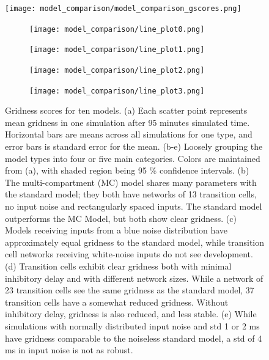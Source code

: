 \documentclass{article}
\begin{document}
    \begin{figure}[H]
        \centering  
        \begin{minipage}[b]{1\textwidth}
            \centering
            \subcaption{}
            \texttt{[image: model\_comparison/model\_comparison\_gscores.png]}
        \end{minipage}
        \begin{minipage}[t]{1\textwidth}
            \begin{subfigure}{0.5\textwidth}
                \subcaption{}
                \texttt{[image: model\_comparison/line\_plot0.png]}
            \end{subfigure}
            \begin{subfigure}{0.5\textwidth}
                \subcaption{}
                \texttt{[image: model\_comparison/line\_plot1.png]}
            \end{subfigure}
            \begin{subfigure}{0.5\textwidth}
                \subcaption{}
                \texttt{[image: model\_comparison/line\_plot2.png]}
            \end{subfigure}
            \begin{subfigure}{0.5\textwidth}
                \subcaption{}
                \texttt{[image: model\_comparison/line\_plot3.png]}
            \end{subfigure}
        \end{minipage}
        \caption{Gridness scores for ten models. (a) Each scatter point represents mean gridness in one simulation after 95 minutes simulated time. Horizontal bars are means across all simulations for one type, and error bars is standard error for the mean. (b-e) Loosely grouping the model types into four or five main categories. Colors are maintained from (a), with shaded region being 95 \% confidence intervals. (b) The multi-compartment (MC) model shares many parameters with the standard model; they both have networks of 13 transition cells, no input noise and rectangularly spaced inputs. The standard model outperforms the MC Model, but both show clear gridness. (c) Models receiving inputs from a blue noise distribution have approximately equal gridness to the standard model, while transition cell networks receiving white-noise inputs do not see development. (d) Transition cells exhibit clear gridness both with minimal inhibitory delay and with different network sizes. While a network of 23 transition cells see the same gridness as the standard model, 37 transition cells have a somewhat reduced gridness. Without inhibitory delay, gridness is also reduced, and less stable. (e) While simulations with normally distributed input noise and std 1 or 2 ms have gridness comparable to the noiseless standard model, a std of 4 ms in input noise is not as robust.}
        \label{gridness_plots}
    \end{figure}
    
\end{document}
